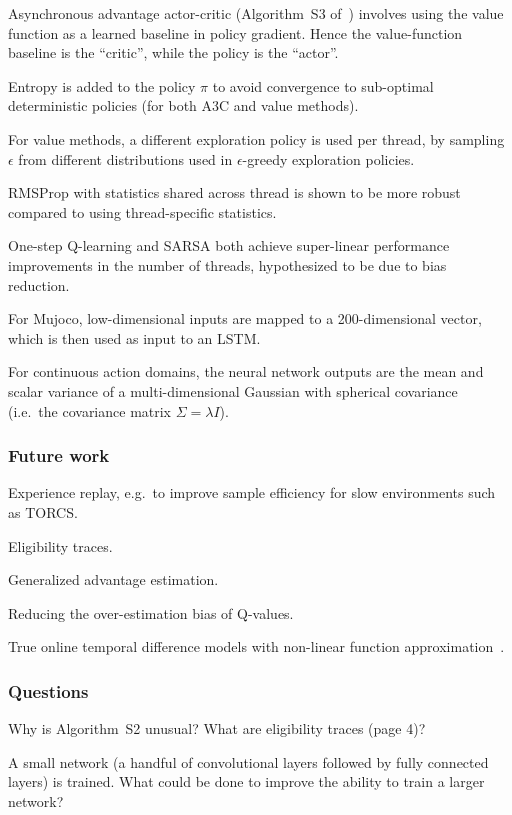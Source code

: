 \documentclass[a4paper, 12pt]{article}
\begin{document}
Asynchronous advantage actor-critic (Algorithm~S3
of~\citet{DBLP:journals/corr/MnihBMGLHSK16}) involves using the value function
as a learned baseline in policy gradient. Hence the value-function baseline is
the ``critic'', while the policy is the ``actor''.

Entropy is added to the policy $\pi$ \citet{williams1991function} to avoid
convergence to sub-optimal deterministic policies (for both A3C and value
methods).

For value methods, a different exploration policy is used per thread, by
sampling $\epsilon$ from different distributions used in $\epsilon$-greedy
exploration policies.

RMSProp with statistics shared across thread is shown to be more robust
compared to using thread-specific statistics.

One-step Q-learning and SARSA both achieve super-linear performance
improvements in the number of threads, hypothesized to be due to bias
reduction.

For Mujoco, low-dimensional inputs are mapped to a 200-dimensional vector,
which is then used as input to an LSTM\@.

For continuous action domains, the neural network outputs are the mean and
scalar variance of a multi-dimensional Gaussian with spherical covariance
(i.e.\ the covariance matrix $\Sigma = \lambda I$).

\subsubsection{Future work}

Experience replay, e.g.\ to improve sample efficiency for slow environments
such as TORCS\@.

Eligibility traces.

Generalized advantage estimation.

Reducing the over-estimation bias of Q-values.

True online temporal difference models with non-linear function
approximation~\citet{DBLP:journals/corr/SeijenMPMS15}.

\subsubsection{Questions}

Why is Algorithm~S2 unusual? What are eligibility traces (page 4)?

A small network (a handful of convolutional layers followed by fully connected
layers) is trained. What could be done to improve the ability to train a larger
network?
\end{document}
